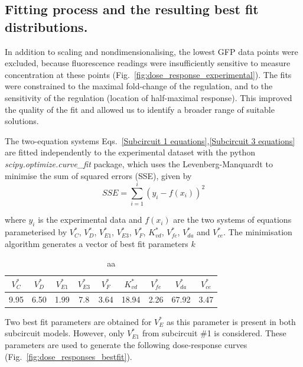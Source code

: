 \subsection{Fitting process and the resulting best fit distributions.} \label{Fitting process and the resulting best fit distributions.}
In addition to scaling and nondimensionalising, the lowest GFP data points were excluded,
because fluorescence readings were insufficiently sensitive
to measure concentration at these points (Fig.~\ref{fig:dose_response_experimental}).  %
The fits were constrained to the maximal fold-change of the regulation, and to the sensitivity of the regulation
(location of half-maximal response).
This improved the quality of the fit and allowed us to identify a broader range of suitable solutions.

The two-equation systems Eqs.~\ref{Subcircuit 1 equations},\ref{Subcircuit 3 equations}
are fitted independently to the experimental dataset with the python \textit{scipy.optimize.curve\_fit} package,
which uses the Levenberg-Manquardt to minimise the sum of squared errors (SSE), given by
\begin{equation}
    SSE = \sum_{i=1}^{i} (y_{i}-f(x_{i}))^2
\end{equation}

where $y_i$ is the experimental data
and $f(x_i)$ are the two systems of equations
parameterised by $V^*_{C}$, $V^*_{D}$, $V^*_{E1}$, $V^*_{E3}$, $V^*_{F}$, $K^*_{vd}$, $V^*_{fe}$, $V^*_{da}$
and $V^*_{ce}$.
The minimisation algorithm generates a vector of best fit parameters $k$

\begin{table}[H]
    \centering
    \begin{tabular}{|c|c|c|c|c|c|c|c|c|}
        \hline
        \textbf{$V^*_{C}$} & \textbf{$V^*_{D}$} & \textbf{$V^*_{E1}$} & \textbf{$V^*_{E3}$} & \textbf{$V^*_{F}$} & \textbf{$K^*_{vd}$} & \textbf{$V^*_{fe}$} & \textbf{$V^*_{da}$} & \textbf{$V^*_{ce}$} \\
        \hline
        9.95 & 6.50 & 1.99 & 7.8 & 3.64 & 18.94 & 2.26 & 67.92 & 3.47 \\
        \hline
    \end{tabular}
    \caption{aa}
    \label{table:bestfit table}
\end{table}


Two best fit parameters are obtained for $V^*_{E}$ as this parameter is present in both subcircuit models.
However, only $V^*_{E1}$ from subcircuit \#1 is considered.
These parameters are used to generate the following dose-response curves (Fig.~\ref{fig:dose_responses_bestfit}).


